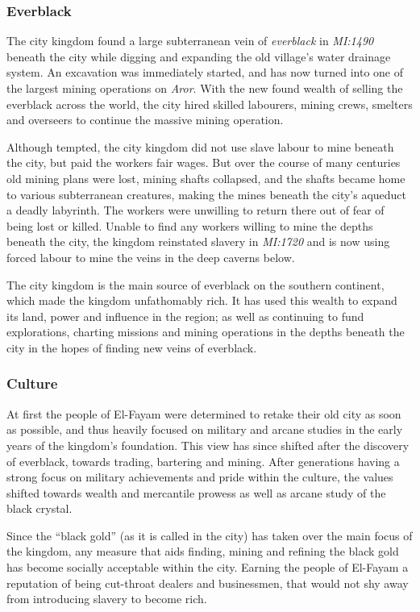 \subsubsection{Everblack}

The city kingdom found a large subterranean vein of \emph{everblack} in
\emph{MI:1490} beneath the city while digging and expanding the old village's
water drainage system. An excavation was immediately started, and has now
turned into one of the largest mining operations on \emph{Aror}. With the new
found wealth of selling the everblack across the world, the city hired skilled
labourers, mining crews, smelters and overseers to continue the massive mining
operation.

Although tempted, the city kingdom did not use slave labour to mine beneath
the city, but paid the workers fair wages. But over the course of many
centuries old mining plans were lost, mining shafts collapsed, and the shafts
became home to various subterranean creatures, making the mines beneath the
city's aqueduct a deadly labyrinth. The workers were unwilling to return
there out of fear of being lost or killed. Unable to find any workers willing
to mine the depths beneath the city, the kingdom reinstated slavery in
\emph{MI:1720} and is now using forced labour to mine the veins in the deep
caverns below.

The city kingdom is the main source of everblack on the southern continent,
which made the kingdom unfathomably rich. It has used this wealth to expand
its land, power and influence in the region; as well as continuing to fund
explorations, charting missions and mining operations in the depths beneath
the city in the hopes of finding new veins of everblack.

\subsubsection{Culture}

At first the people of El-Fayam were determined to retake their old city as
soon as possible, and thus heavily focused on military and arcane studies in
the early years of the kingdom's foundation. This view has since shifted after
the discovery of everblack, towards trading, bartering and mining. After
generations having a strong focus on military achievements and pride within
the culture, the values shifted towards wealth and mercantile prowess as well
as arcane study of the black crystal.

Since the ``black gold'' (as it is called in the city) has taken over the main
focus of the kingdom, any measure that aids finding, mining and refining the
black gold has become socially acceptable within the city. Earning the people
of El-Fayam a reputation of being cut-throat dealers and businessmen, that
would not shy away from introducing slavery to become rich.

